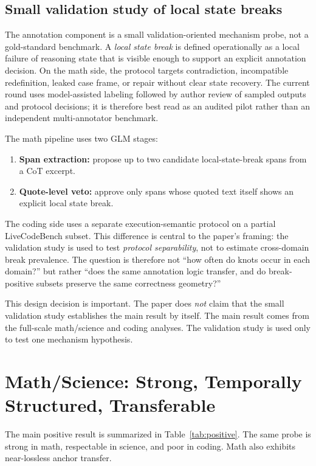 \documentclass[10pt]{article}
\begin{document}
\subsection{Small validation study of local state breaks}

The annotation component is a small validation-oriented mechanism probe, not a gold-standard benchmark. A \emph{local state break} is defined operationally as a local failure of reasoning state that is visible enough to support an explicit annotation decision. On the math side, the protocol targets contradiction, incompatible redefinition, leaked case frame, or repair without clear state recovery. The current round uses model-assisted labeling followed by author review of sampled outputs and protocol decisions; it is therefore best read as an audited pilot rather than an independent multi-annotator benchmark.

The math pipeline uses two GLM stages:
\begin{enumerate}
    \item \textbf{Span extraction:} propose up to two candidate local-state-break spans from a CoT excerpt.
    \item \textbf{Quote-level veto:} approve only spans whose quoted text itself shows an explicit local state break.
\end{enumerate}

The coding side uses a separate execution-semantic protocol on a partial LiveCodeBench subset. This difference is central to the paper's framing: the validation study is used to test \emph{protocol separability}, not to estimate cross-domain break prevalence. The question is therefore not ``how often do knots occur in each domain?'' but rather ``does the same annotation logic transfer, and do break-positive subsets preserve the same correctness geometry?''

This design decision is important. The paper does \emph{not} claim that the small validation study establishes the main result by itself. The main result comes from the full-scale math/science and coding analyses. The validation study is used only to test one mechanism hypothesis.

\section{Math/Science: Strong, Temporally Structured, Transferable}

The main positive result is summarized in Table~\ref{tab:positive}. The same probe is strong in math, respectable in science, and poor in coding. Math also exhibits near-lossless anchor transfer.
\end{document}
